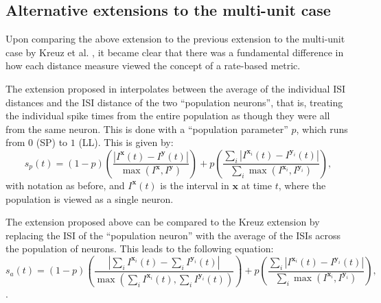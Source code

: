 \subsection{Alternative extensions to the multi-unit case}

Upon comparing the above extension to the previous extension to the multi-unit case by Kreuz et al. \cite{Kreuzetal2009}, it became clear that there was a fundamental difference in how each distance measure viewed the concept of a rate-based metric.


The extension proposed in \cite{Kreuzetal2009} interpolates between the average of the individual ISI distances and the ISI distance of the two ``population neurons'', that is, treating the individual spike times from the entire population as though they were all from the same neuron.  This is done with a ``population parameter'' $p$, which runs from $0$ (SP) to $1$ (LL).  This is given by:
\begin{equation}
\label{pop}
s_p(t) = (1-p)\left( \frac{ | I^{\mathbf{x}}(t) - I^{\mathbf{y}}(t) |}{ \max (I^{\mathbf{x}},I^{\mathbf{y}})}\right) + p\left( \frac{\sum_i | I^{\mathbf{x}_i}(t) - I^{\mathbf{y}_i}(t) |}{\sum_i \max (I^{\mathbf{x}_i},I^{\mathbf{y}_i})} \right),
\end{equation}
with notation as before, and $I^{\mathbf{x}}(t)$ is the interval in $\mathbf{x}$ at time $t$, where the population is viewed as a single neuron.

%

The extension proposed above can be compared to the Kreuz extension by replacing the ISI of the ``population neuron'' with the average of the ISIs across the population of neurons.  This leads to the following equation: 
\begin{equation}
\label{av}
s_a(t) = (1-p) \left(\frac{ | \sum_i I^{\mathbf{x}_i}(t) - \sum_i I^{\mathbf{y}_i}(t) |}{\max (\sum_i I^{\mathbf{x}_i}(t),\sum_i I^{\mathbf{y}_i}(t) )}\right) + p\left( \frac{\sum_i | I^{\mathbf{x}_i}(t) - I^{\mathbf{y}_i}(t) |}{\sum_i \max (I^{\mathbf{x}_i},I^{\mathbf{y}_i})} \right),
\end{equation}.


